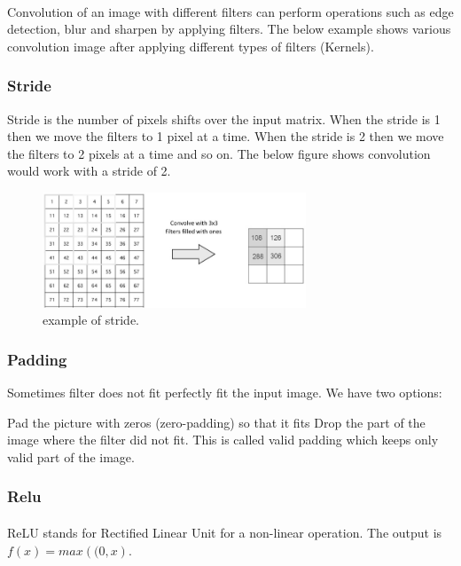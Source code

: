 \paragraph{}
Convolution of an image with different filters can perform operations such as edge detection, blur and sharpen by applying filters. The below example shows various convolution image after applying different types of filters (Kernels).
\subsubsection{Stride}
Stride is the number of pixels shifts over the input matrix. When the stride is 1 then we move the filters to 1 pixel at a time. When the stride is 2 then we move the filters to 2 pixels at a time and so on. The below figure shows convolution would work with a stride of 2.
\begin{figure}
	\centering
	\includegraphics[width=0.7\textwidth]{stride.jpg}
	\caption{example of stride.}
\end{figure}
\subsubsection{Padding}
Sometimes filter does not fit perfectly fit the input image. We have two options:

Pad the picture with zeros (zero-padding) so that it fits Drop the part of the image where the filter did not fit. This is called valid padding which keeps only valid part of the image.
\subsubsection{Relu}
\paragraph{}
ReLU stands for Rectified Linear Unit for a non-linear operation. The output is $f\left(x\right) = max\left( (0,x\right)$.
